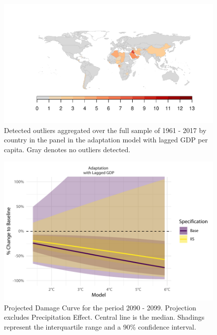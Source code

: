 \documentclass[11pt, letterpaper]{article}
\numberwithin{algorithm}{section}
\numberwithin{assumption}{section}
\numberwithin{lemma}{section}
\numberwithin{theorem}{section}
\numberwithin{corollary}{section}
\numberwithin{remark}{section}
\numberwithin{equation}{section}
\numberwithin{figure}{section}
\numberwithin{table}{section}
\begin{document}
\begin{figure}[!htbp]  \vspace{-.35in}
\centering
\includegraphics[width = \textwidth]{ctry_map_adapt.L1.pdf}
\caption{Detected outliers aggregated over the full sample of 1961 - 2017 by country in the panel in the adaptation model with lagged GDP per capita. Gray denotes no outliers detected.}
\label{fig_map_app2}
\end{figure}

\begin{figure}[!htbp]  \vspace{-.35in}
\centering
\includegraphics[width = \textwidth]{projections_noprcp_appendix.pdf}
\caption{Projected Damage Curve for the period 2090 - 2099. Projection excludes Precipitation Effect. Central line is the median. Shadings represent the interquartile range and a 90\% confidence interval.}
\label{fig_projection_lagged_noprcp}
\end{figure}
\end{document}
